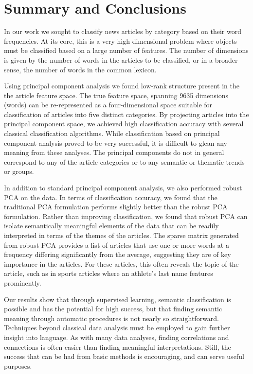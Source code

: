 \documentclass[12pt]{article}
\begin{document}
\section{Summary and Conclusions}

In our work we sought to classify news articles by category based on their word frequencies. At its core, this is a very high-dimensional problem where objects must be classified based on a large number of features. The number of dimensions is given by the number of words in the articles to be classified, or in a broader sense, the number of words in the common lexicon.

Using principal component analysis we found low-rank structure present in the the article feature space. The true feature space, spanning 9635 dimensions (words) can be re-represented as a four-dimensional space suitable for classification of articles into five distinct categories.  By projecting articles into the principal component space, we achieved high classification accuracy with several classical classification algorithms. While classification based on principal component analysis proved to be very successful, it is difficult to glean any meaning from these analyses. The principal components do not in general correspond to any of the article categories or to any semantic or thematic trends or groups.

In addition to standard principal component analysis, we also performed robust PCA on the data. In terms of classification accuracy, we found that the traditional PCA formulation performs slightly better than the robust PCA formulation. Rather than improving classification, we found that robust PCA can isolate semantically meaningful elements of the data that can be readily interpreted in terms of the themes of the articles. The sparse matrix generated from robust PCA provides a list of articles that use one or more words at a frequency differing significantly from the average, suggesting they are of key importance in the articles. For these articles, this often reveals the topic of the article, such as in sports articles where an athlete's last name features prominently.




Our results show that through supervised learning, semantic classification is possible and has the potential for high success, but that finding semantic meaning through automatic procedures is not nearly so straightforward. Techniques beyond classical data analysis must be employed to gain further insight into language. As with many data analyses, finding correlations and connections is often easier than finding meaningful interpretations. Still, the success that can be had from basic methods is encouraging, and can serve useful purposes.
\end{document}
